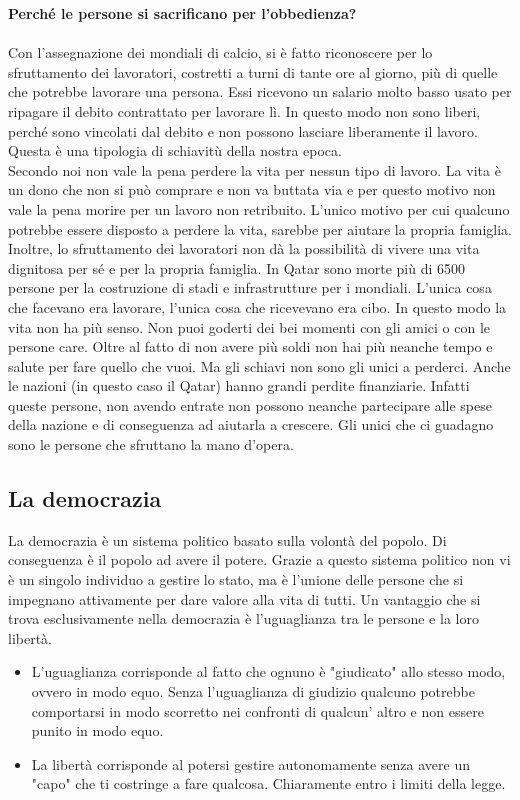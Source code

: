 \documentclass[a4paper, 12pt]{article}
\begin{document}
\textbf{Perché le persone si sacrificano per l'obbedienza?} \\\\
Con l'assegnazione dei mondiali di calcio, si è fatto riconoscere per lo sfruttamento dei lavoratori, costretti a turni di tante ore al giorno, più di quelle che potrebbe lavorare una persona. Essi ricevono un salario molto basso usato per ripagare il debito contrattato per lavorare lì. In questo modo non sono liberi, perché sono vincolati dal debito e non possono lasciare liberamente il lavoro. Questa è una tipologia di schiavitù della nostra epoca. \\ Secondo noi non vale la pena perdere la vita per nessun tipo di lavoro. La vita è un dono che non si può comprare e non va buttata via e per questo motivo non vale la pena morire per un lavoro non retribuito. L'unico motivo per cui qualcuno potrebbe essere disposto a perdere la vita, sarebbe per aiutare la propria famiglia. Inoltre, lo sfruttamento dei lavoratori non dà la possibilità di vivere una vita dignitosa per sé e per la propria famiglia. In Qatar sono morte più di 6500 persone per la costruzione di stadi e infrastrutture per i mondiali. L'unica cosa che facevano era lavorare, l'unica cosa che ricevevano era cibo. In questo modo la vita non ha più senso. Non puoi goderti dei bei momenti con gli amici o con le persone care. Oltre al fatto di non avere più soldi non hai più neanche tempo e salute per fare quello che vuoi. Ma gli schiavi non sono gli unici a perderci. Anche le nazioni (in questo caso il Qatar) hanno grandi perdite finanziarie. Infatti queste persone, non avendo entrate non possono neanche partecipare alle spese della nazione e di conseguenza ad aiutarla a crescere. Gli unici che ci guadagno sono le persone che sfruttano la mano d'opera.

\subsection{La democrazia}

La democrazia è un sistema politico basato sulla volontà del popolo. Di conseguenza è il popolo ad avere il potere. Grazie a questo sistema politico non vi è un singolo individuo a gestire lo stato, ma è l'unione delle persone che si impegnano attivamente per dare valore alla vita di tutti. Un vantaggio che si trova esclusivamente nella democrazia è l'uguaglianza tra le persone e la loro libertà.

\begin{itemize}
    \item L'uguaglianza corrisponde al fatto che ognuno è "giudicato" allo stesso modo, ovvero in modo equo. Senza l'uguaglianza di giudizio qualcuno potrebbe comportarsi in modo scorretto nei confronti di qualcun' altro e non essere punito in modo equo.
    \item La libertà corrisponde al potersi gestire autonomamente senza avere un "capo" che ti costringe a fare qualcosa. Chiaramente entro i limiti della legge.
\end{itemize}
\end{document}
